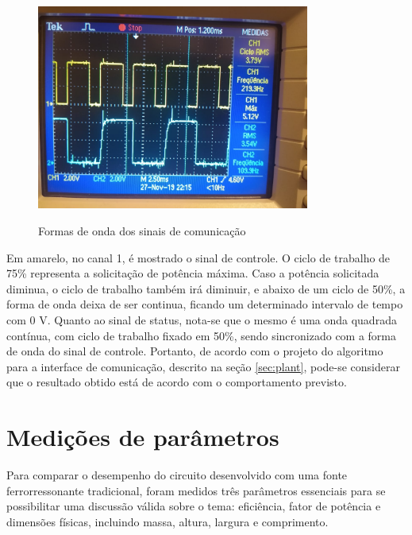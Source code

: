 \begin{figure}[H]
    \centering
    \caption{Formas de onda dos sinais de comunicação}
    \includegraphics[width=0.8\textwidth]{./dados/figuras/onda_comm}
    \label{fig:figura-onda_comm}
\end{figure}

Em amarelo, no canal 1, é mostrado o sinal de controle. O ciclo de trabalho de 75\% representa a solicitação de potência máxima. Caso a potência solicitada diminua, o ciclo de trabalho também irá diminuir, e abaixo de um ciclo de 50\%, a forma de onda deixa de ser continua, ficando um determinado intervalo de tempo com 0 V. Quanto ao sinal de status, nota-se que o mesmo é uma onda quadrada contínua, com ciclo de trabalho fixado em 50\%, sendo sincronizado com a forma de onda do sinal de controle. Portanto, de acordo com o projeto do algoritmo para a interface de comunicação, descrito na seção \ref{sec:plant}, pode-se considerar que o resultado obtido está de acordo com o comportamento previsto.


\section{Medições de parâmetros}
Para comparar o desempenho do circuito desenvolvido com uma fonte ferrorressonante tradicional, foram medidos três parâmetros essenciais para se possibilitar uma discussão válida sobre o tema: eficiência, fator de potência e dimensões físicas, incluindo massa, altura, largura e comprimento. 

